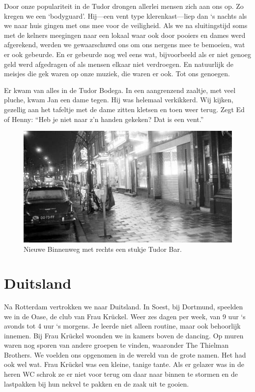 \documentclass[10pt,twoside, openright]{memoir}
\begin{document}
Door onze populariteit in de Tudor drongen allerlei mensen zich aan ons op. Zo kregen we een `bodyguard'. Hij---een vent type klerenkast---liep dan `s nachts als we naar huis gingen met ons mee voor de veiligheid. Als we na sluitingstijd soms met de kelners meegingen naar een lokaal waar ook door pooiers en dames werd afgerekend, werden we gewaarschuwd ons om ons nergens mee te bemoeien, wat er ook gebeurde. En er gebeurde nog wel eens wat, bijvoorbeeld als er niet genoeg geld werd afgedragen of als mensen elkaar niet verdroegen. En natuurlijk de meisjes die gek waren op onze muziek, die waren er ook. Tot ons genoegen. 

Er kwam van alles in de Tudor Bodega. In een aangrenzend zaaltje, met veel pluche, kwam Jan een dame tegen. Hij was helemaal verkikkerd. Wij kijken, gezellig aan het tafeltje met de dame zitten kletsen en toen weer terug. Zegt Ed of Henny: ``Heb je niet naar z’n handen gekeken? Dat is een vent.'' 

\begin{figure}
\includegraphics[width=\textwidth]{img/ch28/tudor}
\caption*{\footnotesize Nieuwe Binnenweg met rechts een stukje Tudor Bar.}
\end{figure}

\chapter{Duitsland} %
\label{cha:duitsland}

Na Rotterdam vertrokken we naar Duitsland. In Soest, bij Dortmund, speelden we in de Oase, de club van Frau Krückel. Weer zes dagen per week, van 9 uur `s avonds tot 4 uur `s morgens. Je leerde niet alleen routine, maar ook behoorlijk innemen. Bij Frau Krückel woonden we in kamers boven de dancing. Op muren waren nog sporen van andere groepen te vinden, waaronder The Thielman Brothers. We voelden ons opgenomen in de wereld van de grote namen. Het had ook wel wat. Frau Krückel was een kleine, tanige tante. Als er gelazer was in de heren WC schrok ze er niet voor terug om daar naar binnen te stormen en de lastpakken bij hun nekvel te pakken en de zaak uit te gooien.
\end{document}
